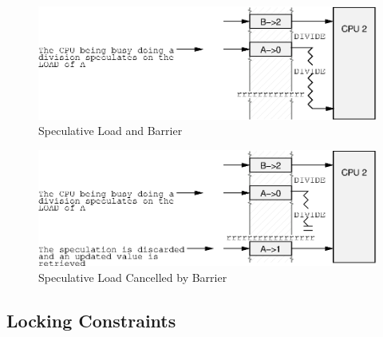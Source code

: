 \begin{figure}[htb]
\centering
\includegraphics{advsync/SpeculativeLoadBarrier}
\caption{Speculative Load and Barrier}
\end{figure}

\begin{figure}[htb]
\centering
\includegraphics{advsync/SpeculativeLoadBarrierCancel}
\caption{Speculative Load Cancelled by Barrier}
\end{figure}

\subsection{Locking Constraints}
\label{sec:advsync:Locking Constraints}

